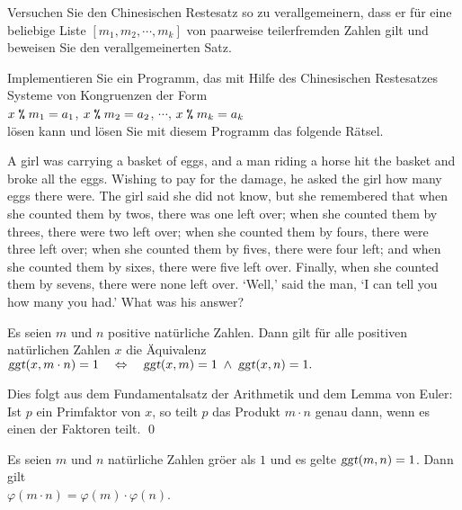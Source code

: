 \exercise
Versuchen Sie den Chinesischen Restesatz so zu verallgemeinern, dass er f\"{u}r eine beliebige
Liste $[m_1, m_2, \cdots, m_k]$ von paarweise teilerfremden Zahlen gilt und beweisen
Sie den verallgemeinerten Satz.

\exercise
Implementieren Sie ein Programm, das mit Hilfe des Chinesischen Restesatzes Systeme von
Kongruenzen der Form
\\[0.2cm]
\hspace*{1.3cm}
$x \;\texttt{\%}\; m_1 = a_1$, 
$x \;\texttt{\%}\; m_2 = a_2$, $\cdots$,
$x \;\texttt{\%}\; m_k = a_k$
\\[0.2cm]
l\"{o}sen kann und l\"{o}sen Sie mit diesem Programm das folgende R\"{a}tsel.
\vspace*{0.2cm}

\begin{minipage}[t]{0.9\linewidth}
  A girl was carrying a basket of eggs, and a man riding a horse hit
  the basket and broke all the eggs. Wishing to pay for the damage, he
  asked the girl how many eggs there were. The girl said she did not
  know, but she remembered that when she counted them by twos, there
  was one left over; when she counted them by threes, there were two
  left over; when she counted them by fours, there were three left
  over; when she counted them by fives, there were four left; and when
  she counted them by sixes, there were five left over. Finally, when
  she counted them by sevens, there were none left over. `Well,' said
  the man, `I can tell you how many you had.' What was his answer?
\end{minipage}

\begin{Satz} \label{satz:china3}
  Es seien $m$ und $n$ positive nat\"{u}rliche Zahlen.
  Dann gilt f\"{u}r alle positiven nat\"{u}rlichen Zahlen $x$ die \"{A}quivalenz
  \\[0.2cm]
  \hspace*{1.3cm}
  $\textsl{ggt}(x, m \cdot n) = 1 \quad \Leftrightarrow \quad
   \textsl{ggt}(x, m) = 1 \;\wedge\; \textsl{ggt}(x, n) = 1.
  $
\end{Satz}

\proof
Dies folgt aus dem Fundamentalsatz der Arithmetik und dem Lemma von Euler: Ist $p$ ein
Primfaktor von $x$, so teilt $p$ das Produkt $m \cdot n$ genau dann, wenn es einen der
Faktoren teilt. \qed



\begin{Satz} \lb
  Es seien $m$ und $n$ nat\"{u}rliche Zahlen gr\"{o}\3er als $1$ und es gelte $\textsl{ggt}(m,n) = 1$.
  Dann gilt
  \\[0.2cm]
  \hspace*{1.3cm}
  $\varphi(m \cdot n) = \varphi(m) \cdot \varphi(n)$.
\end{Satz}

